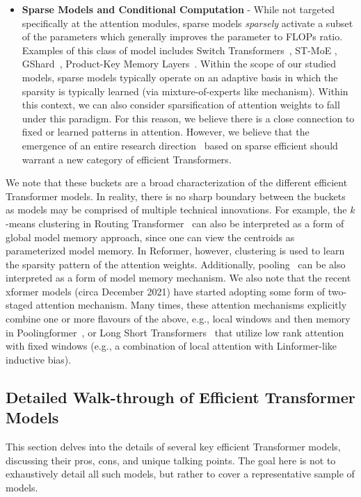 \begin{itemize}
\item \textbf{Sparse Models and Conditional Computation} - While not targeted specifically at the attention modules, sparse models \textit{sparsely} activate a subset of the parameters which generally improves the parameter to FLOPs ratio. Examples of this class of model includes Switch Transformers~\citep{fedus2021switch}, ST-MoE \citep{zoph2022designing}, GShard~\citep{lepikhin2020gshard}, Product-Key Memory Layers~\citep{lample2019large}. Within the scope of our studied models, sparse models typically operate on an adaptive basis in which the sparsity is typically learned (via mixture-of-experts like mechanism). Within this context, we can also consider sparsification of attention weights to fall under this paradigm. For this reason, we believe there is a close connection to fixed or learned patterns in attention. However, we believe that the emergence of an entire research direction~\citep{roller2021hash,lewis2021base,lepikhin2020gshard,du2021glam} based on sparse efficient should warrant a new category of efficient Transformers.

\end{itemize}

We note that these buckets are a broad characterization of the different efficient Transformer models. In reality, there is no sharp boundary between the buckets as models may be comprised of multiple technical innovations. For example, the $k$-means clustering in Routing Transformer~\citep{roy2020efficient} can also be interpreted as a form of global model memory approach, since one can view the centroids as parameterized model memory. In Reformer, however, clustering is used to learn the sparsity pattern of the attention weights. Additionally, pooling~\citep{liu2018generating} can be also interpreted as a form of model memory mechanism. We also note that the recent xformer models (circa December 2021) have started adopting some form of two-staged attention mechanism. Many times, these attention mechanisms explicitly combine one or more flavours of the above, e.g., local windows and then memory in Poolingformer~\citep{zhang2021poolingformer}, or Long Short Transformers~\citep{zhu2021long} that utilize low rank attention with fixed windows (e.g., a combination of local attention with Linformer-like inductive bias).

\subsection{Detailed Walk-through of Efficient Transformer Models} This section delves into the details of several key efficient Transformer models, discussing their pros, cons, and unique talking points. The goal here is not to exhaustively detail all such models, but rather to cover a representative sample of models. 

